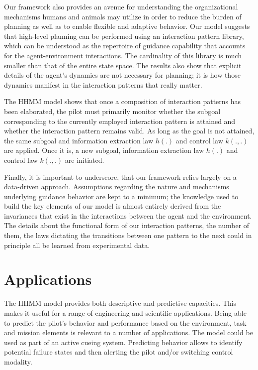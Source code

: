 \documentclass[journal]{IEEEtran}
\begin{document}
Our framework also provides an avenue for understanding the organizational mechanisms humans and animals may utilize in order to reduce the burden of planning as well as to enable flexible and adaptive behavior. Our model suggests that high-level planning can be performed using an interaction pattern library, which can be understood as the repertoire of guidance capability that accounts for the agent-environment interactions. The cardinality of this library is much smaller than that of the entire state space. The results also show that explicit details of the agent's dynamics are not necessary for planning; it is how those dynamics manifest in the interaction patterns that really matter. 

The HHMM model shows that once a composition of interaction patterns has been elaborated, the pilot must primarily monitor whether the subgoal corresponding to the currently employed interaction pattern is attained and whether the interaction pattern remains valid. As long as the goal is not attained, the same subgoal and information extraction law $h(.)$ and control law $k(.,.)$ are applied. Once it is, a new subgoal, information extraction law $h(.)$ and control law $k(.,.)$ are initiated. 



Finally, it is important to underscore, that our framework relies largely on a data-driven approach. Assumptions regarding the nature and mechanisms underlying guidance behavior are kept to a minimum; the knowledge used to build the key elements of our model is almost entirely derived from the invariances that exist in the interactions between the agent and the environment. The details about the functional form of our interaction patterns, the number of them, the laws dictating the transitions between one pattern to the next could in principle all be learned from experimental data.  


\section{Applications}

The HHMM model provides both descriptive and predictive capacities. This makes it useful for a range of engineering and scientific applications.  Being able to predict the pilot's behavior and performance based on the environment, task and mission elements is relevant to a number of applications. The model could be used as part of an active cueing system. Predicting behavior allows to identify potential failure states and then alerting the pilot and/or switching control modality.  
\end{document}
